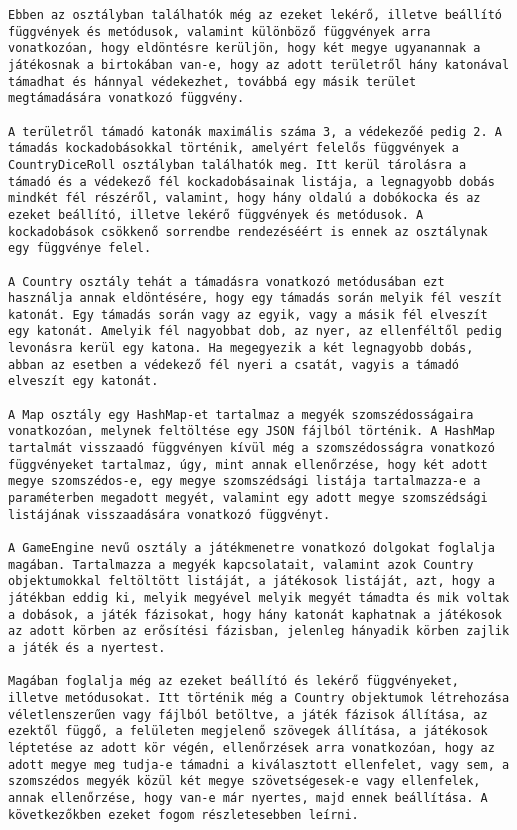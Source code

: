 \begin{verbatim}
Ebben az osztályban találhatók még az ezeket lekérő, illetve beállító függvények és metódusok, valamint különböző függvények arra vonatkozóan, hogy eldöntésre kerüljön, hogy két megye ugyanannak a játékosnak a birtokában van-e, hogy az adott területről hány katonával támadhat és hánnyal védekezhet, továbbá egy másik terület megtámadására vonatkozó függvény. 

A területről támadó katonák maximális száma 3, a védekezőé pedig 2. A támadás kockadobásokkal történik, amelyért felelős függvények a CountryDiceRoll osztályban találhatók meg. Itt kerül tárolásra a támadó és a védekező fél kockadobásainak listája, a legnagyobb dobás mindkét fél részéről, valamint, hogy hány oldalú a dobókocka és az ezeket beállító, illetve lekérő függvények és metódusok. A kockadobások csökkenő sorrendbe rendezéséért is ennek az osztálynak egy függvénye felel. 

A Country osztály tehát a támadásra vonatkozó metódusában ezt használja annak eldöntésére, hogy egy támadás során melyik fél veszít katonát. Egy támadás során vagy az egyik, vagy a másik fél elveszít egy katonát. Amelyik fél nagyobbat dob, az nyer, az ellenféltől pedig levonásra kerül egy katona. Ha megegyezik a két legnagyobb dobás, abban az esetben a védekező fél nyeri a csatát, vagyis a támadó elveszít egy katonát. 

A Map osztály egy HashMap-et tartalmaz a megyék szomszédosságaira vonatkozóan, melynek feltöltése egy JSON fájlból történik. A HashMap tartalmát visszaadó függvényen kívül még a szomszédosságra vonatkozó függvényeket tartalmaz, úgy, mint annak ellenőrzése, hogy két adott megye szomszédos-e, egy megye szomszédsági listája tartalmazza-e a paraméterben megadott megyét, valamint egy adott megye szomszédsági listájának visszaadására vonatkozó függvényt. 

A GameEngine nevű osztály a játékmenetre vonatkozó dolgokat foglalja magában. Tartalmazza a megyék kapcsolatait, valamint azok Country objektumokkal feltöltött listáját, a játékosok listáját, azt, hogy a játékban eddig ki, melyik megyével melyik megyét támadta és mik voltak a dobások, a játék fázisokat, hogy hány katonát kaphatnak a játékosok az adott körben az erősítési fázisban, jelenleg hányadik körben zajlik a játék és a nyertest. 

Magában foglalja még az ezeket beállító és lekérő függvényeket, illetve metódusokat. Itt történik még a Country objektumok létrehozása véletlenszerűen vagy fájlból betöltve, a játék fázisok állítása, az ezektől függő, a felületen megjelenő szövegek állítása, a játékosok léptetése az adott kör végén, ellenőrzések arra vonatkozóan, hogy az adott megye meg tudja-e támadni a kiválasztott ellenfelet, vagy sem, a szomszédos megyék közül két megye szövetségesek-e vagy ellenfelek, annak ellenőrzése, hogy van-e már nyertes, majd ennek beállítása. A következőkben ezeket fogom részletesebben leírni. 


\end{verbatim}
